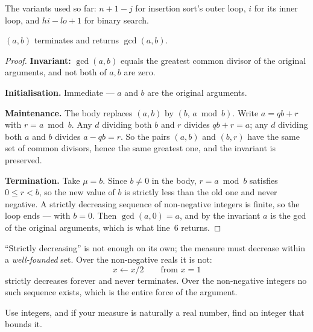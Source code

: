 The variants used so far: $n+1-j$ for insertion sort's outer loop, $i$ for its
inner loop, and $\mathit{hi}-\mathit{lo}+1$ for binary search.


\begin{theorem}\label{thm:euclid}
$(a,b)$ terminates and returns $\gcd(a,b)$.
\end{theorem}

\begin{proof}
\textbf{Invariant:} $\gcd(a, b)$ equals the greatest common divisor of the
original arguments, and not both of $a,b$ are zero.

\smallskip
\textbf{Initialisation.} Immediate --- $a$ and $b$ are the original arguments.

\smallskip
\textbf{Maintenance.} The body replaces $(a,b)$ by $(b,\, a \bmod b)$. Write
$a = qb + r$ with $r = a \bmod b$. Any $d$ dividing both $b$ and $r$ divides
$qb + r = a$; any $d$ dividing both $a$ and $b$ divides $a - qb = r$. So the
pairs $(a,b)$ and $(b,r)$ have the same set of common divisors, hence the same
greatest one, and the invariant is preserved.

\smallskip
\textbf{Termination.} Take $\mu = b$. Since $b \neq 0$ in the body,
$r = a \bmod b$ satisfies $0 \le r < b$, so the new value of $b$ is strictly
less than the old one and never negative. A strictly decreasing sequence of
non-negative integers is finite, so the loop ends --- with $b = 0$. Then
$\gcd(a,0) = a$, and by the invariant $a$ is the gcd of the original arguments,
which is what line~6 returns.
\end{proof}

\begin{alertbox}
``Strictly decreasing'' is not enough on its own; the measure must decrease
within a \emph{well-founded} set. Over the non-negative reals it is not:
\[ x \gets x/2 \qquad \text{from } x = 1 \]
strictly decreases forever and never terminates. Over the non-negative integers
no such sequence exists, which is the entire force of the argument.

\smallskip
Use integers, and if your measure is naturally a real number, find an integer
that bounds it.
\end{alertbox}

